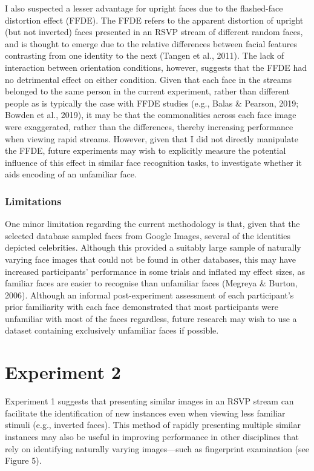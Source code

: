 \documentclass[
  english,
  man]{apa6}
\begin{document}
I also suspected a lesser advantage for upright faces due to the flashed-face distortion effect (FFDE). The FFDE refers to the apparent distortion of upright (but not inverted) faces presented in an RSVP stream of different random faces, and is thought to emerge due to the relative differences between facial features contrasting from one identity to the next (Tangen et al., 2011). The lack of interaction between orientation conditions, however, suggests that the FFDE had no detrimental effect on either condition. Given that each face in the streams belonged to the same person in the current experiment, rather than different people as is typically the case with FFDE studies (e.g., Balas \& Pearson, 2019; Bowden et al., 2019), it may be that the commonalities across each face image were exaggerated, rather than the differences, thereby increasing performance when viewing rapid streams. However, given that I did not directly manipulate the FFDE, future experiments may wish to explicitly measure the potential influence of this effect in similar face recognition tasks, to investigate whether it aids encoding of an unfamiliar face.

\hypertarget{limitations}{%
\subsubsection{Limitations}\label{limitations}}

One minor limitation regarding the current methodology is that, given that the selected database sampled faces from Google Images, several of the identities depicted celebrities. Although this provided a suitably large sample of naturally varying face images that could not be found in other databases, this may have increased participants' performance in some trials and inflated my effect sizes, as familiar faces are easier to recognise than unfamiliar faces (Megreya \& Burton, 2006). Although an informal post-experiment assessment of each participant's prior familiarity with each face demonstrated that most participants were unfamiliar with most of the faces regardless, future research may wish to use a dataset containing exclusively unfamiliar faces if possible.

\hypertarget{experiment-2}{%
\section{Experiment 2}\label{experiment-2}}

Experiment 1 suggests that presenting similar images in an RSVP stream can facilitate the identification of new instances even when viewing less familiar stimuli (e.g., inverted faces). This method of rapidly presenting multiple similar instances may also be useful in improving performance in other disciplines that rely on identifying naturally varying images---such as fingerprint examination (see Figure 5).
\end{document}
